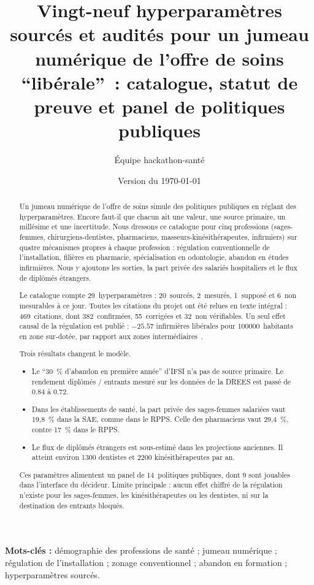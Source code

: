 \documentclass[11pt]{article}
\title{Vingt-neuf hyperparamètres sourcés et audités pour un jumeau numérique de l'offre de soins \enquote{libérale}~: catalogue, statut de preuve et panel de politiques publiques}
\author[1]{Équipe hackathon-santé}
\affil[1]{Projet \enquote{jumeau numérique de l'offre de soins}, dépôt \texttt{hackathon-sante/v2}}
\date{Version du \today}
\begin{document}
\maketitle

\begin{abstract}
Un jumeau numérique de l'offre de soins simule des politiques publiques en
réglant des hyperparamètres. Encore faut-il que chacun ait une valeur, une
source primaire, un millésime et une incertitude. Nous dressons ce catalogue
pour cinq professions (sages-femmes, chirurgiens-dentistes, pharmaciens,
masseurs-kinésithérapeutes, infirmiers) sur quatre mécanismes propres à chaque
profession : régulation conventionnelle de l'installation, filières en
pharmacie, spécialisation en odontologie, abandon en études infirmières.
Nous y ajoutons les sorties, la part privée des salariés hospitaliers et le
flux de diplômés étrangers.

Le catalogue compte 29~hyperparamètres : 20~sourcés, 2~mesurés, 1~supposé et
6~non mesurables à ce jour. Toutes les citations du projet ont été relues en
texte intégral : 469~citations, dont 382~confirmées, 55~corrigées et
32~non vérifiables. Un seul effet causal de la régulation est publié :
$\num{-25.57}$ infirmières libérales pour \num{100000}~habitants en zone
sur-dotée, par rapport aux zones intermédiaires~\cite{irdes270}.

Trois résultats changent le modèle.
\begin{itemize}
\item Le \enquote{30~\% d'abandon en première année} d'IFSI n'a pas de
  source primaire. Le rendement diplômés / entrants mesuré sur les données
  de la DREES est passé de \num{0.84}\mesure{} à \num{0.72}\mesure.
\item Dans les établissements de santé, la part privée des sages-femmes
  salariées vaut 19,8~\%\mesure{} dans la SAE, comme dans le RPPS. Celle
  des pharmaciens vaut 29,4~\%\mesure{}, contre 17~\% dans le RPPS.
\item Le flux de diplômés étrangers est sous-estimé dans les projections
  anciennes. Il atteint environ \num{1300} dentistes et \num{2200}
  kinésithérapeutes par an.
\end{itemize}

Ces paramètres alimentent un panel de 14~politiques publiques, dont 9 sont
jouables dans l'interface du décideur. Limite principale : aucun effet
chiffré de la régulation n'existe pour les sages-femmes, les
kinésithérapeutes ou les dentistes, ni sur la destination des entrants
bloqués.
\end{abstract}
\noindent\textbf{Mots-clés :} démographie des professions de santé ;
jumeau numérique ; régulation de l'installation ; zonage conventionnel ;
abandon en formation ; hyperparamètres sourcés.
\end{document}
